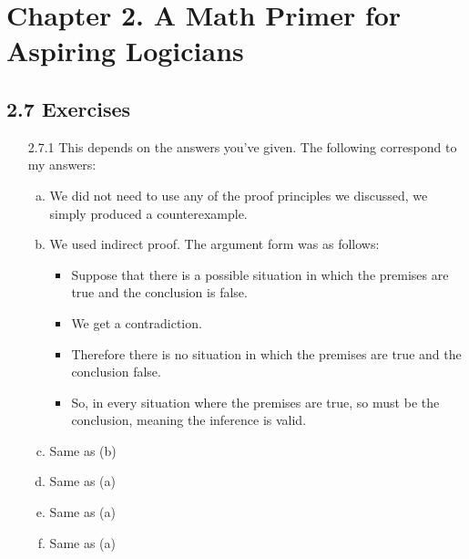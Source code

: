 \chapter{Chapter 2. A Math Primer for Aspiring Logicians}

\section*{2.7 Exercises}

	\begin{enumerate}

		\item[2.7.1] This depends on the answers you've given. The following correspond to my answers:
		
			\begin{enumerate}[(a)]
			
				\item We did not need to use any of the proof principles we discussed, we simply produced a counterexample. 
				
				\item We used indirect proof. The argument form was as follows:
				\begin{itemize}
				
					\item Suppose that there is a possible situation in which the premises are true and the conclusion is false. 
					
					\item We get a contradiction. 
					
					\item Therefore there is no situation in which the premises are true and the conclusion false. 
				
					\item So, in every situation where the premises are true, so must be the conclusion, meaning the inference is valid.
				
				\end{itemize}
				
				\item Same as (b)

				\item Same as (a)
				
				\item Same as (a)
				
				\item Same as (a)
			
			\end{enumerate}
		

\end{enumerate}
